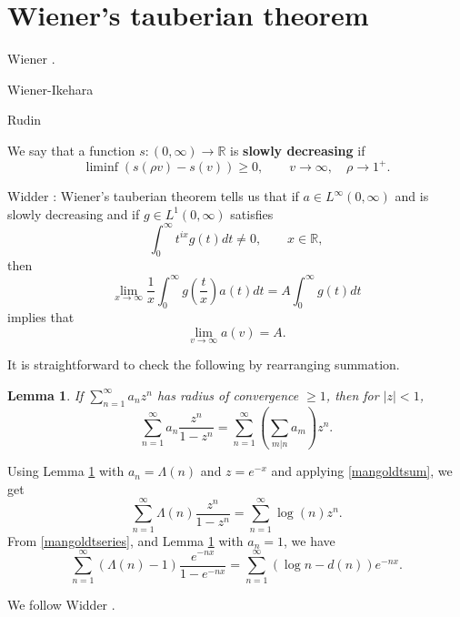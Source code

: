 \documentclass{amsart}
\newtheorem{lemma}[theorem]{Lemma}
\begin{document}
\section{Wiener's tauberian theorem}
Wiener \cite[Chapter~III]{wiener}.

Wiener-Ikehara \cite{chandrasekharan148}

Rudin \cite[p.~229, Theorem 9.7]{rudin}

We say that a function $s:(0,\infty) \to \mathbb{R}$ is \textbf{slowly decreasing} if 
\[
\liminf (s(\rho v)-s(v)) \geq 0, \qquad v \to \infty, \quad \rho \to 1^+.
\]

Widder \cite[p.~211, Theorem 10b]{widder}: Wiener's tauberian theorem tells us that if
$a \in L^\infty(0,\infty)$ and is slowly decreasing and if $g \in L^1(0,\infty)$ satisfies
\[
\int_0^\infty t^{ix} g(t) dt \neq 0, \qquad x \in \mathbb{R},
\]
then
\[
\lim_{x \to \infty} \frac{1}{x} \int_0^\infty g\left(\frac{t}{x}\right) a(t) dt = A \int_0^\infty g(t) dt
\]
implies that
\[
\lim_{v \to \infty} a(v) = A.
\]





It is straightforward to check the following by rearranging summation.

\begin{lemma}
If $\sum_{n=1}^\infty a_n z^n$ has radius of convergence $\geq 1$, then for $|z|<1$,
\[
\sum_{n=1}^\infty a_n \frac{z^n}{1-z^n} = \sum_{n=1}^\infty \left( \sum_{m | n} a_m\right) z^n.
\]
\label{rearrangement}
\end{lemma}

Using Lemma \ref{rearrangement} with $a_n=\Lambda(n)$ and $z=e^{-x}$ and applying \eqref{mangoldtsum}, we get
\begin{equation}
\sum_{n=1}^\infty \Lambda(n) \frac{z^n}{1-z^n} = \sum_{n=1}^\infty \log(n) z^n.
\label{mangoldtseries}
\end{equation}
From \eqref{mangoldtseries}, and Lemma \ref{rearrangement} with $a_n=1$, we have
\[
\sum_{n=1}^\infty (\Lambda(n)-1) \frac{e^{-nx}}{1-e^{-nx}}
=\sum_{n=1}^\infty (\log n  - d(n)) e^{-nx}.
\]

We follow
Widder \cite[p.~231, Theorem 16.6]{widder}.
\end{document}
